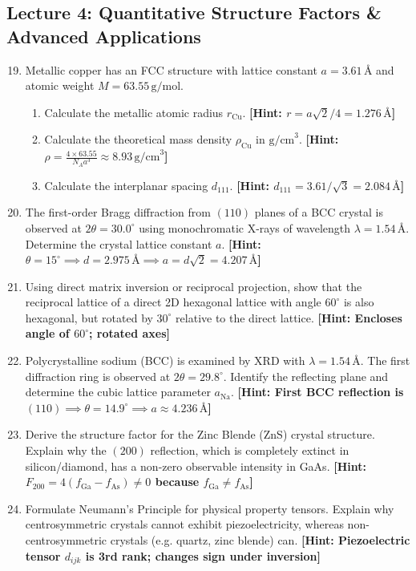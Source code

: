 \documentclass[11pt,a4paper]{article}
\begin{document}
\subsection*{Lecture 4: Quantitative Structure Factors \& Advanced Applications}
\begin{enumerate}[leftmargin=1.8em, label=\textbf{4.\arabic*}]
    \setcounter{enumi}{18}
    \item Metallic copper has an FCC structure with lattice constant $a = 3.61\,\text{\AA}$ and atomic weight $M = 63.55\,\text{g/mol}$.
    \begin{enumerate}[label=(\alph*)]
        \item Calculate the metallic atomic radius $r_{\text{Cu}}$. \hfill \textbf{[Hint: $r = a\sqrt{2}/4 = 1.276\,\text{\AA}$]}
        \item Calculate the theoretical mass density $\rho_{\text{Cu}}$ in $\text{g/cm}^3$. \hfill \textbf{[Hint: $\rho = \frac{4 \times 63.55}{N_A a^3} \approx 8.93\,\text{g/cm}^3$]}
        \item Calculate the interplanar spacing $d_{111}$. \hfill \textbf{[Hint: $d_{111} = 3.61/\sqrt{3} = 2.084\,\text{\AA}$]}
    \end{enumerate}
    \item The first-order Bragg diffraction from $(110)$ planes of a BCC crystal is observed at $2\theta = 30.0^\circ$ using monochromatic X-rays of wavelength $\lambda = 1.54\,\text{\AA}$. Determine the crystal lattice constant $a$. \hfill \textbf{[Hint: $\theta = 15^\circ \implies d = 2.975\,\text{\AA} \implies a = d\sqrt{2} = 4.207\,\text{\AA}$]}
    \item Using direct matrix inversion or reciprocal projection, show that the reciprocal lattice of a direct 2D hexagonal lattice with angle $60^\circ$ is also hexagonal, but rotated by $30^\circ$ relative to the direct lattice. \hfill \textbf{[Hint: Encloses angle of $60^\circ$; rotated axes]}
    \item Polycrystalline sodium (BCC) is examined by XRD with $\lambda = 1.54\,\text{\AA}$. The first diffraction ring is observed at $2\theta = 29.8^\circ$. Identify the reflecting plane and determine the cubic lattice parameter $a_{\text{Na}}$. \hfill \textbf{[Hint: First BCC reflection is $(110) \implies \theta = 14.9^\circ \implies a \approx 4.236\,\text{\AA}$]}
    \item Derive the structure factor for the Zinc Blende (ZnS) crystal structure. Explain why the $(200)$ reflection, which is completely extinct in silicon/diamond, has a non-zero observable intensity in GaAs. \hfill \textbf{[Hint: $F_{200} = 4(f_{\text{Ga}} - f_{\text{As}}) \neq 0$ because $f_{\text{Ga}} \neq f_{\text{As}}$]}
    \item Formulate Neumann's Principle for physical property tensors. Explain why centrosymmetric crystals cannot exhibit piezoelectricity, whereas non-centrosymmetric crystals (e.g. quartz, zinc blende) can. \hfill \textbf{[Hint: Piezoelectric tensor $d_{ijk}$ is 3rd rank; changes sign under inversion]}
\end{enumerate}
\end{document}
